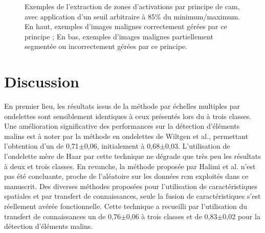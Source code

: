 \begin{figure}[H]
    \caption{Exemples de l'extraction de zones d'activations par principe de \gls{cam}, avec application d'un seuil arbitraire à 85\% du minimum/maximum. En haut, exemples d'images malignes correctement gérées par ce principe ; En bas, exemples d'images malignes partiellement segmentée ou incorrectement gérées par ce principe.}
    \label{fig:example_image_improvement_ft}
\end{figure}\par

\clearpage

\section{Discussion}
En premier lieu, les résultats issus de la méthode par échelles multiples par ondelettes sont sensiblement identiques à ceux présentés lors du  à trois classes. Une amélioration significative des performances sur la détection d'éléments malins est à noter par la méthode en ondelettes de Wiltgen et al., permettant l'obtention d'un \fscore{} de 0,71$\pm$0,06, initialement à 0,68$\pm$0,03. L'utilisation de l'ondelette mère de Haar par cette technique ne dégrade que très peu les résultats à deux et trois classes. En revanche, la méthode proposée par Halimi et al. n'est pas été concluante, proche de l'aléatoire sur les données \gls{rcm} exploités dans ce manuscrit. Des diverses méthodes proposées pour l'utilisation de caractéristiques spatiales et par transfert de connaissances, seule la fusion de caractéristiques s'est réellement avérée fonctionnelle. Cette technique a recueilli par l'utilisation du transfert de connaissances un \fscore{} de 0,76$\pm$0,06 à trois classes et de 0,83$\pm$0,02 pour la détection d'éléments malins.\par

